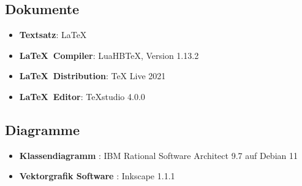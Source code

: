 \subsection{Dokumente}
\begin{itemize}
	\item \textbf{Textsatz}: \LaTeX {}
	\item \textbf{\LaTeX\ Compiler}: LuaHBTeX, Version 1.13.2
	\item \textbf{\LaTeX\ Distribution}: TeX Live 2021
	\item \textbf{\LaTeX\ Editor}: TeXstudio 4.0.0
\end{itemize}
\subsection{Diagramme}
\begin{itemize}
	\item \textbf{Klassendiagramm }: IBM Rational Software Architect 9.7 auf Debian 11
	\item \textbf{Vektorgrafik Software }: Inkscape 1.1.1
\end{itemize}